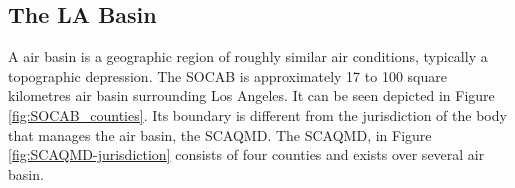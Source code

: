 %
%
%
%
%
%
\subsection{The LA Basin} \label{subsec:labasin}
A air basin is a geographic region of roughly similar air conditions, typically a topographic depression.  The SOCAB is approximately 17 to 100 square kilometres air basin surrounding Los Angeles.  It can be seen depicted in Figure \ref{fig:SOCAB_counties}.  Its boundary is different from the jurisdiction of the body that manages the air basin, the SCAQMD. The SCAQMD, in Figure \ref{fig:SCAQMD-jurisdiction} consists of four counties and exists over several air basin.  

